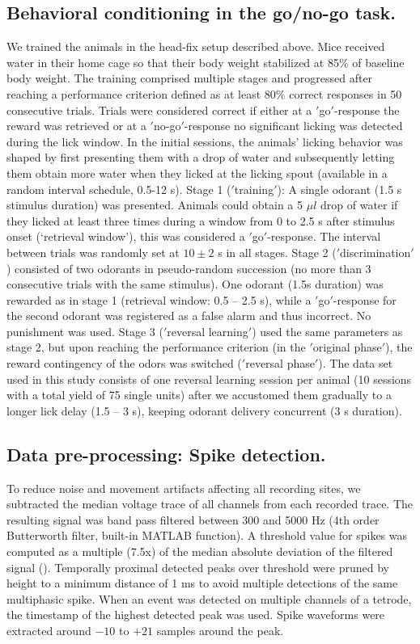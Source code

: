\subsection{Behavioral conditioning in the go/no-go task.} We trained the animals in the head-fix setup described above. Mice received water in their home cage so that their body weight stabilized at 85$\%$ of baseline body weight. The training comprised multiple stages and progressed after reaching a performance criterion defined as at least 80$\%$ correct responses in 50 consecutive trials. Trials were considered correct if either at a $'$go$'$-response the reward was retrieved or at a $'$no-go$'$-response no significant licking was detected during the lick window. In the initial sessions, the animals’ licking behavior was shaped by first presenting them with a drop of water and subsequently letting them obtain more water when they licked at the licking spout (available in a random interval schedule, 0.5-12 s). Stage 1 ($'$training$'$): A single odorant (1.5 s stimulus duration) was presented. Animals could obtain a 5 $\mu l$ drop of water if they licked at least three times during a window from 0 to 2.5 s after stimulus onset (‘retrieval window’), this was considered a $'$go$'$-response. The interval between trials was randomly set at $10\pm 2$ s in all stages. Stage 2 ($'$discrimination$'$) consisted of two odorants in pseudo-random succession (no more than 3 consecutive trials with the same stimulus). One odorant (1.5s duration) was rewarded as in stage 1 (retrieval window: 0.5 – 2.5 s), while a $'$go$'$-response for the second odorant was registered as a false alarm and thus incorrect. No punishment was used. Stage 3 ($'$reversal learning$'$) used the same parameters as stage 2, but upon reaching the performance criterion (in the $'$original phase$'$), the reward contingency of the odors was switched ($'$reversal phase$'$). The data set used in this study consists of one reversal learning session per animal (10 sessions with a total yield of 75 single units) after we accustomed them gradually to a longer lick delay (1.5 – 3 s), keeping odorant delivery concurrent (3 s duration). 

\subsection{Data pre-processing: Spike detection.} To reduce noise and movement artifacts affecting all recording sites, we subtracted the median voltage trace of all channels from each recorded trace. The resulting signal was band pass filtered between 300 and 5000 Hz (4th order Butterworth filter, built-in MATLAB function). A threshold value for spikes was computed as a multiple (7.5x) of the median absolute deviation of the filtered signal (\cite{Quiroga}). Temporally proximal detected peaks over threshold were pruned by height to a minimum distance of 1 ms to avoid multiple detections of the same multiphasic spike. When an event was detected on multiple channels of a tetrode, the timestamp of the highest detected peak was used. Spike waveforms were extracted around $-10$ to $+21$ samples around the peak.

